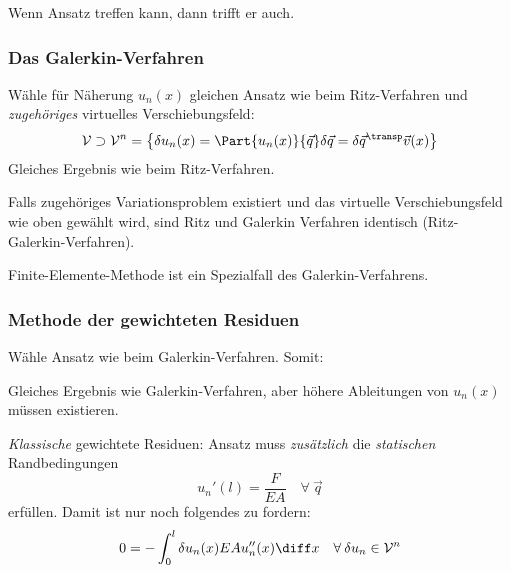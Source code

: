 			\begin{bemerkung}
				Wenn Ansatz treffen kann, dann trifft er auch.
			\end{bemerkung}
		
		\subsubsection{Das Galerkin-Verfahren} %
			\label{subs:galerkin}
			Wähle für Näherung $u_n(x)$ gleichen Ansatz wie beim Ritz-Verfahren und \emph{zugehöriges} virtuelles Verschiebungsfeld:
			\[
				\mathcal V \supset \mathcal V^n = \left\{
					\delta u_n(x) = \Part{u_n(x)}{\vec q} \delta \vec q = \delta \vec q^\transp \vec v(x)
				\right\}
			\]
			Gleiches Ergebnis wie beim Ritz-Verfahren.
			
			\begin{bemerkungen}
				\item Falls zugehöriges Variationsproblem existiert und das virtuelle Verschiebungsfeld wie oben gewählt wird, sind Ritz und Galerkin Verfahren identisch (Ritz-Galerkin-Verfahren).
				
				\item Finite-Elemente-Methode ist ein Spezialfall des Galerkin-Verfahrens.
			\end{bemerkungen}
		
		\subsubsection{Methode der gewichteten Residuen} %
			\label{subs:residuen}
			Wähle Ansatz wie beim Galerkin-Verfahren. Somit:
			
			\begin{bemerkungen}
				\item Gleiches Ergebnis wie Galerkin-Verfahren, aber höhere Ableitungen von $u_n(x)$ müssen existieren.
				\item \emph{Klassische} gewichtete Residuen: Ansatz muss \emph{zusätzlich} die \emph{statischen} Randbedingungen
					\[
						u_n' (l) = \frac{F}{EA} \quad \forall \: \vec q
					\]
					erfüllen. Damit ist nur noch folgendes zu fordern:
					\[
						0 = - \int_0^l \delta u_n(x) EAu_n''(x) \diff x \quad \forall \: \delta u_n \in \mathcal V^n
					\]
			\end{bemerkungen}
		
